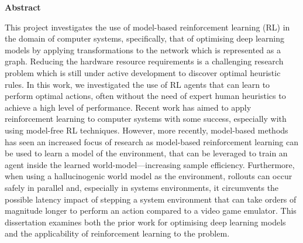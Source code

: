 \newpage
{\Huge \bf Abstract}
\vspace{24pt} 

This project investigates the use of model-based reinforcement learning (RL) in the domain of computer systems, specifically, that of optimising deep learning models by applying transformations to the network which is represented as a graph. Reducing the hardware resource requirements is a challenging research problem which is still under active development to discover optimal heuristic rules. In this work, we investigated the use of RL agents that can learn to perform optimal actions, often without the need of expert human heuristics to achieve a high level of performance. Recent work has aimed to apply reinforcement learning to computer systems with some success, especially with using model-free RL techniques. However, more recently, model-based methods has seen an increased focus of research as model-based reinforcement learning can be used to learn a model of the environment, that can be leveraged to train an agent inside the learned world-model---increasing sample efficiency. Furthermore, when using a hallucinogenic world model as the environment, rollouts can occur safely in parallel and, especially in systems environments, it circumvents the possible latency impact of stepping a system environment that can take orders of magnitude longer to perform an action compared to a video game emulator. This dissertation examines both the prior work for optimising deep learning models and the applicability of reinforcement learning to the problem.

\vspace*{\fill}
